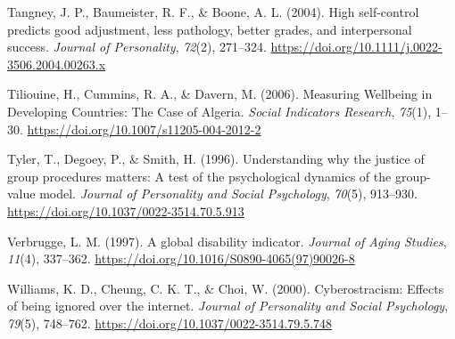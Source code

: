 \documentclass[
  letterpaper,
  DIV=11,
  numbers=noendperiod]{scrartcl}
\newlength{\cslhangindent}
\newlength{\cslentryspacingunit} %
\newenvironment{CSLReferences}[2] %
 {%
  \setlength{\parindent}{0pt}
  \ifodd #1
  \let\oldpar\par
  \def\par{\hangindent=\cslhangindent\oldpar}
  \fi
  \setlength{\parskip}{#2\cslentryspacingunit}
 }%
 {}
\begin{document}
\begin{CSLReferences}{1}{0}
\leavevmode{}%
Tangney, J. P., Baumeister, R. F., \& Boone, A. L. (2004). High
self-control predicts good adjustment, less pathology, better grades,
and interpersonal success. \emph{Journal of Personality}, \emph{72}(2),
271--324. \url{https://doi.org/10.1111/j.0022-3506.2004.00263.x}

\leavevmode{}%
Tiliouine, H., Cummins, R. A., \& Davern, M. (2006). Measuring Wellbeing
in Developing Countries: The Case of Algeria. \emph{Social Indicators
Research}, \emph{75}(1), 1--30.
\url{https://doi.org/10.1007/s11205-004-2012-2}

\leavevmode{}%
Tyler, T., Degoey, P., \& Smith, H. (1996). Understanding why the
justice of group procedures matters: A test of the psychological
dynamics of the group-value model. \emph{Journal of Personality and
Social Psychology}, \emph{70}(5), 913--930.
\url{https://doi.org/10.1037/0022-3514.70.5.913}

\leavevmode{}%
Verbrugge, L. M. (1997). A global disability indicator. \emph{Journal of
Aging Studies}, \emph{11}(4), 337--362.
\url{https://doi.org/10.1016/S0890-4065(97)90026-8}

\leavevmode{}%
Williams, K. D., Cheung, C. K. T., \& Choi, W. (2000). Cyberostracism:
Effects of being ignored over the internet. \emph{Journal of Personality
and Social Psychology}, \emph{79}(5), 748--762.
\url{https://doi.org/10.1037/0022-3514.79.5.748}

\end{CSLReferences}
\end{document}
